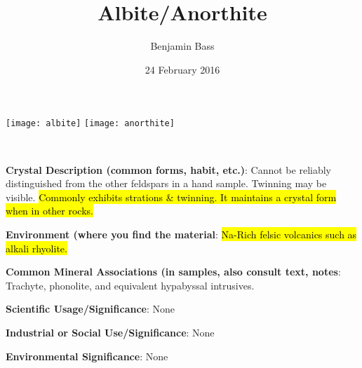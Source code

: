 \documentclass[10pt]{article}
\author{Benjamin Bass}
\date{24 February 2016}
\title{\vspace{-2.0cm}Albite/Anorthite} %
\begin{document}
\maketitle


\begin{center}
  \texttt{[image: albite]}
  \texttt{[image: anorthite]}
\end{center}



\
\
\
\
\
\
\
\
\
\

\begin{framed}
  \textbf{Crystal Description (common forms, habit, etc.)}: Cannot be reliably distinguished from the other feldspars in a hand sample. Twinning may be visible. \hl{Commonly exhibits strations \& twinning. It maintains a crystal form when in other rocks.}
\end{framed}

\begin{framed}
  \textbf{Environment (where you find the material}: \hl{Na-Rich felsic volcanics such as alkali rhyolite.}
\end{framed}

\begin{framed}
  \textbf{Common Mineral Associations (in samples, also consult text, notes}:  Trachyte, phonolite, and equivalent hypabyssal intrusives.
\end{framed}

\begin{framed}
  \textbf{Scientific Usage/Significance}: None
\end{framed}

\begin{framed}
  \textbf{Industrial or Social Use/Significance}: None
\end{framed}

\begin{framed}
  \textbf{Environmental Significance}: None
\end{framed}

\end{document}
